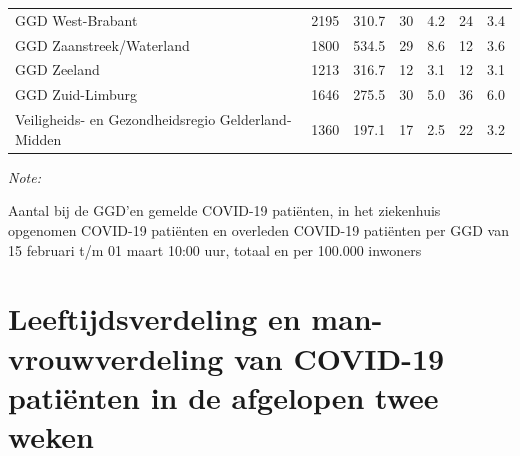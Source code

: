 \documentclass[
  english,
  man,floatsintext]{apa6}
\begin{document}
\begin{table}
\begin{threeparttable}
\begin{tabular}{lrrrrrr}
GGD West-Brabant & 2195 & 310.7 & 30 & 4.2 & 24 & 3.4\\
GGD Zaanstreek/Waterland & 1800 & 534.5 & 29 & 8.6 & 12 & 3.6\\
GGD Zeeland & 1213 & 316.7 & 12 & 3.1 & 12 & 3.1\\
GGD Zuid-Limburg & 1646 & 275.5 & 30 & 5.0 & 36 & 6.0\\
Veiligheids- en Gezondheidsregio Gelderland-Midden & 1360 & 197.1 & 17 & 2.5 & 22 & 3.2\\
\bottomrule
\end{tabular}
\begin{tablenotes}
\item \textit{Note: } 
\item Aantal bij de GGD’en gemelde COVID-19 patiënten, in het ziekenhuis opgenomen COVID-19 patiënten en overleden COVID-19 patiënten per GGD van 15 februari t/m 01 maart 10:00 uur, totaal en per 100.000 inwoners
\end{tablenotes}
\end{threeparttable}
\endgroup{}
\end{table}

\newpage

\hypertarget{leeftijdsverdeling-en-man-vrouwverdeling-van-covid-19-patiuxebnten-in-de-afgelopen-twee-weken}{%
\section{Leeftijdsverdeling en man-vrouwverdeling van COVID-19 patiënten in de afgelopen twee weken}\label{leeftijdsverdeling-en-man-vrouwverdeling-van-covid-19-patiuxebnten-in-de-afgelopen-twee-weken}}
\end{document}
